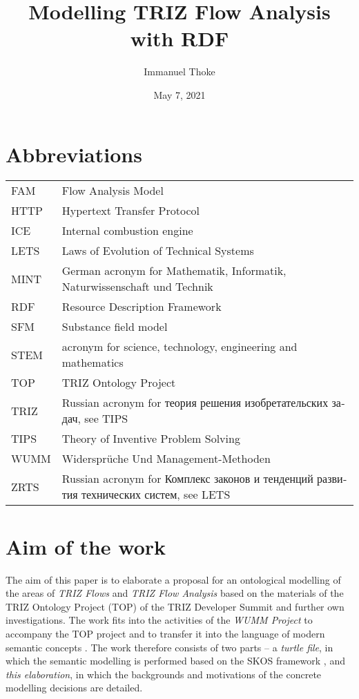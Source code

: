 \documentclass[a4paper,11pt]{article}
\author{Immanuel Thoke}
\title{Modelling TRIZ Flow Analysis with RDF}
\date{May 7, 2021}
\newcommand{\ru}[1]{\foreignlanguage{russian}{#1}}
\begin{document}
\maketitle
\tableofcontents
\newpage 
\section{Abbreviations}

\begin{center}
  \begin{tabular}{l@{\hskip1em--\hskip1em}p{12cm}}
FAM & Flow Analysis Model\\
HTTP & Hypertext Transfer Protocol\\
ICE & Internal combustion engine\\
LETS & Laws of Evolution of Technical Systems\\
MINT & German acronym for Mathematik, Informatik, Naturwissenschaft und
Technik\\
RDF & Resource Description Framework \\
SFM & Substance field model\\
STEM & acronym for science, technology, engineering and mathematics\\
TOP & TRIZ Ontology Project\\
TRIZ & Russian acronym for \ru{теория решения изобретательских задач}, see
TIPS\\
TIPS & Theory of Inventive Problem Solving \\
WUMM & Widersprüche Und Management-Methoden\\
ZRTS & Russian acronym for \ru{Комплекс законов и тенденций развития
  технических систем}, see LETS
  \end{tabular}
\end{center}

\section{Aim of the work}

The aim of this paper is to elaborate a proposal for an ontological modelling
of the areas of \emph{TRIZ Flows} and \emph{TRIZ Flow Analysis} based on the
materials of the TRIZ Ontology Project (TOP) of the TRIZ Developer Summit
\cite{TOP} and further own investigations. The work fits into the activities
of the \emph{WUMM Project} \cite{WUMM} to accompany the TOP project and to
transfer it into the language of modern semantic concepts \cite{WUMMTOP}.  The
work therefore consists of two parts -- a \emph{turtle file}, in which the
semantic modelling is performed based on the SKOS framework \cite{SKOS}, and
\emph{this elaboration}, in which the backgrounds and motivations of the
concrete modelling decisions are detailed.
\end{document}
